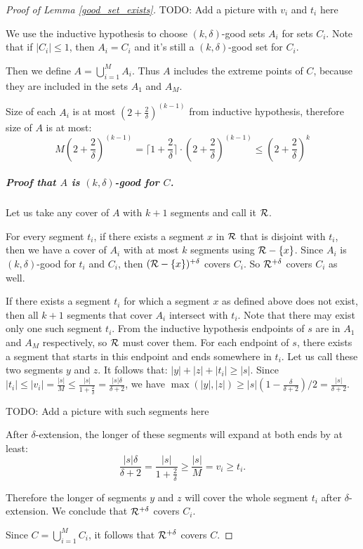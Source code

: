 \begin{proof}[Proof of Lemma \ref{good_set_exists}]
TODO: Add a picture with $v_i$ and $t_i$ here

We use the inductive hypothesis to choose $(k, \delta)$-good sets $A_i$
for sets $C_i$. Note that if $|C_i| \le 1$, then $A_i = C_i$
and it's still a $(k, \delta)$-good set for $C_i$.

Then we define $A = \bigcup_{i=1}^{M} A_i$.
Thus $A$ includes the extreme points of $C$,
because they are included in the sets $A_1$ and $A_M$.

Size of each $A_i$ is at most $(2+\frac{2}{\delta})^(k-1)$ from inductive
hypothesis, therefore size of $A$ is at most:
$$M(2+\frac{2}{\delta})^{(k-1)} =
\lceil1+\frac{2}{\delta}\rceil\cdot(2+\frac{2}{\delta})^{(k-1)}
\le (2+\frac{2}{\delta})^k$$


\subparagraph{Proof that $A$ is $(k, \delta)$-good for $C$.}
Let us take any cover of $A$ with $k+1$ segments and call it $\mathcal{R}$.

For every segment $t_i$, if there exists a segment $x$ in $\mathcal{R}$ 
that is disjoint with $t_i$,
then we have a cover of $A_i$ with at most $k$
segments using $\mathcal{R} - \{x\}$.
Since $A_i$ is $(k, \delta)$-good for $t_i$ and $C_i$,
then $(\mathcal{R} - \{x\})^{+\delta}$ covers $C_i$.
So $\mathcal{R}^{+\delta}$ covers $C_i$ as well.

If there exists a segment $t_i$ for which a segment $x$ as defined above
does not exist, then all $k+1$ segments that cover
$A_i$ intersect with $t_i$.
Note that there may exist only one such segment $t_i$.
From the inductive hypothesis endpoints of $s$ are
in $A_1$ and $A_M$ respectively, so $\mathcal{R}$ must cover them.
For each endpoint of $s$, there exists
a segment that starts in this endpoint and ends somewhere in $t_i$.
Let us call these two segments $y$ and $z$. It follows that:
$|y| + |z| + |t_i| \ge |s|$.
Since $|t_i| \le |v_i| = \frac{|s|}{M} \le \frac{|s|}{1+\frac{2}{\delta}} = \frac{|s|\delta}{\delta+2}$,
we have $\max(|y|, |z|) \ge |s|(1-\frac{\delta}{\delta+2})/2 = \frac{|s|}{\delta+2}$.

TODO: Add a picture with such segments here

After $\delta$-extension, the longer of these segments will
expand at both ends by at least:
$$\frac{|s|\delta}{\delta+2} = \frac{|s|}{1+\frac{2}{\delta}} \ge \frac{|s|}{M} = v_i \ge t_i.$$

Therefore the longer of segments $y$ and $z$ will cover the whole segment $t_i$
after $\delta$-extension. We conclude that $\mathcal{R}^{+\delta}$ covers $C_i$.

Since $C = \bigcup_{i=1}^M C_i$,
it follows that $\mathcal{R}^{+\delta}$ covers $C$.



\end{proof}
